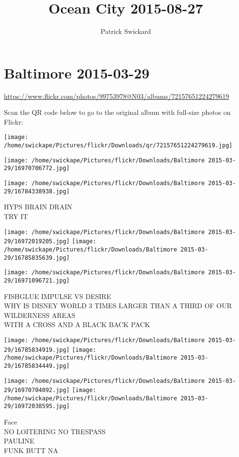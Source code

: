 \documentclass[10pt,letterpaper]{article}
\title{Ocean City 2015-08-27}
\author{Patrick Swickard}
\date{}
\begin{document}
\section*{Baltimore 2015-03-29}

\url{https://www.flickr.com/photos/99753978@N03/albums/72157651224279619}

Scan the QR code below to go to the original album with full-size photos on Flickr:

\texttt{[image: /home/swickape/Pictures/flickr/Downloads/qr/72157651224279619.jpg]}
\pagebreak

\texttt{[image: /home/swickape/Pictures/flickr/Downloads/Baltimore 2015-03-29/16970706772.jpg]}

\vspace{0.25in}
\texttt{[image: /home/swickape/Pictures/flickr/Downloads/Baltimore 2015-03-29/16784338938.jpg]}

HYPS BRAIN DRAIN\\
TRY IT
\pagebreak

\texttt{[image: /home/swickape/Pictures/flickr/Downloads/Baltimore 2015-03-29/16972019205.jpg]}
\texttt{[image: /home/swickape/Pictures/flickr/Downloads/Baltimore 2015-03-29/16785835639.jpg]}

\vspace{0.25in}
\texttt{[image: /home/swickape/Pictures/flickr/Downloads/Baltimore 2015-03-29/16971096721.jpg]}

FISHGLUE IMPULSE VS DESIRE\\
WHY IS DISNEY WORLD 3 TIMES LARGER THAN A THIRD OF OUR WILDERNESS AREAS\\
WITH A CROSS AND A BLACK BACK PACK
\pagebreak

\texttt{[image: /home/swickape/Pictures/flickr/Downloads/Baltimore 2015-03-29/16785834919.jpg]}
\texttt{[image: /home/swickape/Pictures/flickr/Downloads/Baltimore 2015-03-29/16785834449.jpg]}

\texttt{[image: /home/swickape/Pictures/flickr/Downloads/Baltimore 2015-03-29/16970704092.jpg]}
\texttt{[image: /home/swickape/Pictures/flickr/Downloads/Baltimore 2015-03-29/16972038595.jpg]}

Face\\
NO LOITERING NO TRESPASS\\
PAULINE\\
FUNK BUTT NA
\pagebreak
\end{document}

